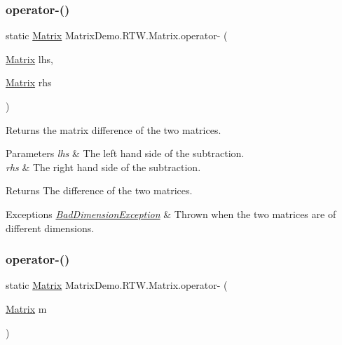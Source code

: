 \subsubsection{\texorpdfstring{operator-\/()}{operator-()}\hspace{0.1cm}{\footnotesize\ttfamily [1/2]}}
{\footnotesize\ttfamily static \mbox{\hyperlink{class_matrix_demo_1_1_r_t_w_1_1_matrix}{Matrix}} Matrix\+Demo.\+R\+T\+W.\+Matrix.\+operator-\/ (\begin{DoxyParamCaption}\item[{\mbox{\hyperlink{class_matrix_demo_1_1_r_t_w_1_1_matrix}{Matrix}}}]{lhs,  }\item[{\mbox{\hyperlink{class_matrix_demo_1_1_r_t_w_1_1_matrix}{Matrix}}}]{rhs }\end{DoxyParamCaption})\hspace{0.3cm}{\ttfamily [static]}}



Returns the matrix difference of the two matrices. 


\begin{DoxyParams}{Parameters}
{\em lhs} & The left hand side of the subtraction.\\
\hline
{\em rhs} & The right hand side of the subtraction.\\
\hline
\end{DoxyParams}
\begin{DoxyReturn}{Returns}
The difference of the two matrices.
\end{DoxyReturn}

\begin{DoxyExceptions}{Exceptions}
{\em \mbox{\hyperlink{class_matrix_demo_1_1_r_t_w_1_1_bad_dimension_exception}{Bad\+Dimension\+Exception}}} & Thrown when the two matrices are of different dimensions.\\
\hline
\end{DoxyExceptions}
\mbox{\label{class_matrix_demo_1_1_r_t_w_1_1_matrix_a115c01ce2236a801cfa99bb685aea0ff}} 
\subsubsection{\texorpdfstring{operator-\/()}{operator-()}\hspace{0.1cm}{\footnotesize\ttfamily [2/2]}}
{\footnotesize\ttfamily static \mbox{\hyperlink{class_matrix_demo_1_1_r_t_w_1_1_matrix}{Matrix}} Matrix\+Demo.\+R\+T\+W.\+Matrix.\+operator-\/ (\begin{DoxyParamCaption}\item[{\mbox{\hyperlink{class_matrix_demo_1_1_r_t_w_1_1_matrix}{Matrix}}}]{m }\end{DoxyParamCaption})\hspace{0.3cm}{\ttfamily [static]}}



